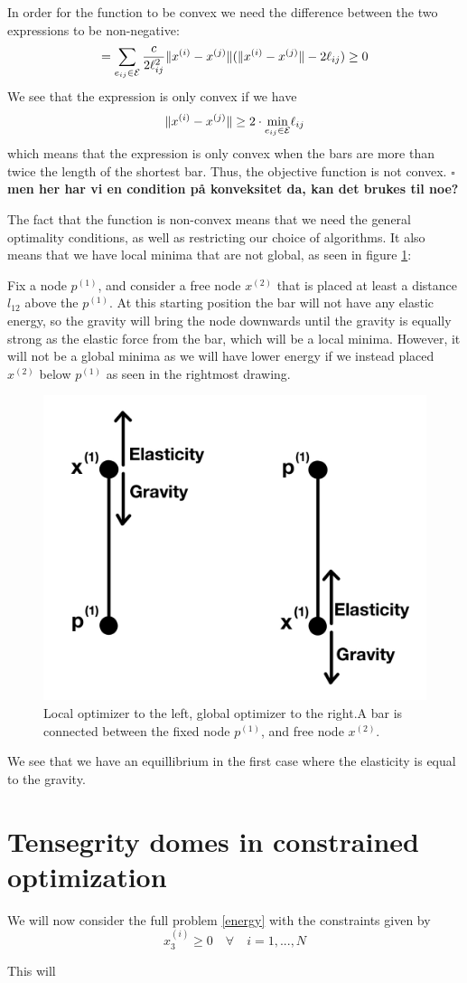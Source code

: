 In order for the function to be convex we need the difference between the two expressions to be non-negative:
\begin{equation}
    =\sum\limits_{e_{ij} \in \mathcal{E}}\frac{c}{2\ell_{ij}^2} \lVert x^{(i)} - x^{(j)}\rVert (\lVert x^{(i)} - x^{(j)}\rVert - 2 \ell_{ij}) \geq 0
\end{equation}
We see that the expression is only convex if we have
$$\lVert x^{(i)} - x^{(j)}\rVert \geq 2 \cdot \underset{{e_{ij} \in \mathcal{E}}}{\text{min}}\ell_{ij}$$
which means that the expression is only convex when the bars are more than twice the length of the shortest bar. Thus, the objective function is not convex. $\square$
\textbf{men her har vi en condition på konveksitet da, kan det brukes til noe?}

The fact that the function is non-convex means that we need the general optimality conditions, as well as restricting our choice of algorithms. It also means that we have local minima that are not global, as seen in figure \ref{fig:local_optimizer}:

Fix a node $p^{(1)}$, and consider a free node $x^{(2)}$ that is placed at least a distance $l_{12}$ above the $p^{(1)}$. At this starting position the bar will not have any elastic energy, so the gravity will bring the node downwards until the gravity is equally strong as the elastic force from the bar, which will be a local minima. However, it will not be a global minima as we will have lower energy if we instead placed $x^{(2)}$ below $p^{(1)}$ as seen in the rightmost drawing. 

\begin{figure}
    \centering\includegraphics[width=0.5\columnwidth]{Bilder/local_optimizer.jpeg}
    \caption{Local optimizer to the left, global optimizer to the right.A bar is connected between the fixed node $p^{(1)}$, and free node $x^{(2)}$.}
    \label{fig:local_optimizer}
\end{figure}

We see that we have an equillibrium in the first case where the elasticity is equal to the gravity.

\section{Tensegrity domes in constrained optimization}
We will now consider the full problem \eqref{energy} with the constraints given by 
\begin{equation}
    x_3^{(i)} \geq 0 \quad \forall \quad i = 1,...,N
\end{equation}

 This will
